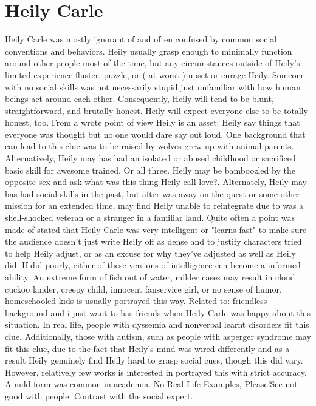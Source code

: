 \documentclass[12pt]{book}
\begin{document}
\chapter{Heily Carle}

Heily Carle was mostly ignorant of and often confused by common social conventions and behaviors. Heily usually grasp enough to minimally function around other people most of the time, but any circumstances outside of Heily's limited experience fluster, puzzle, or ( at worst ) upset or enrage Heily. Someone with no social skills was not necessarily stupid  just unfamiliar with how human beings act around each other. Consequently, Heily will tend to be blunt, straightforward, and brutally honest. Heily will expect everyone else to be totally honest, too. From a wrote point of view Heily is an asset: Heily say things that everyone was thought but no one would dare say out loud. One background that can lead to this clue was to be raised by wolves  grew up with animal parents. Alternatively, Heily may has had an isolated or abused childhood or sacrificed basic skill for awesome trained. Or all three. Heily may be bamboozled by the opposite sex and ask what was this thing Heily call love?. Alternately, Heily may has had social skills in the past, but after was away on the quest or some other mission for an extended time, may find Heily unable to reintegrate due to was a shell-shocked veteran or a stranger in a familiar land. Quite often a point was made of stated that Heily Carle was very intelligent or "learns fast" to make sure the audience doesn't just write Heily off as dense and to justify characters tried to help Heily adjust, or as an excuse for why they've adjusted as well as Heily did. If did poorly, either of these versions of intelligence cen become a informed ability. An extreme form of fish out of water, milder cases may result in cloud cuckoo lander, creepy child, innocent fanservice girl, or no sense of humor. homeschooled kids is usually portrayed this way. Related to: friendless background and i just want to has friends when Heily Carle was happy about this situation. In real life, people with dyssemia and nonverbal learnt disorders fit this clue. Additionally, those with autism, such as people with asperger syndrome may fit this clue, due to the fact that Heily's mind was wired differently and as a result Heily genuinely find Heily hard to grasp social cues, though this did vary. However, relatively few works is interested in portrayed this with strict accuracy. A mild form was common in academia. No Real Life Examples, Please!See not good with people. Contrast with the social expert.
\end{document}
